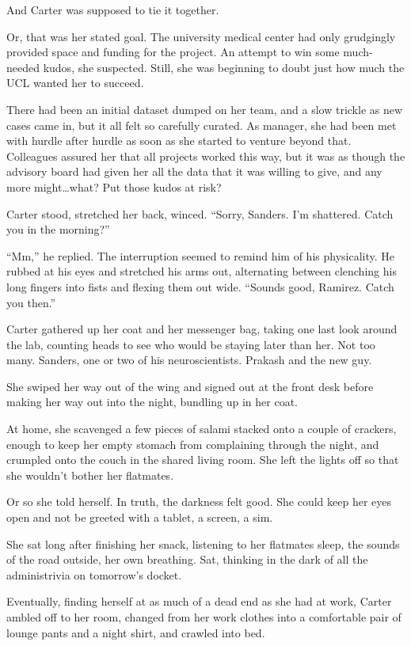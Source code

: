 And Carter was supposed to tie it together.

Or, that was her stated goal. The university medical center had only grudgingly provided space and funding for the project. An attempt to win some much-needed kudos, she suspected. Still, she was beginning to doubt just how much the UCL wanted her to succeed.

There had been an initial dataset dumped on her team, and a slow trickle as new cases came in, but it all felt so carefully curated. As manager, she had been met with hurdle after hurdle as soon as she started to venture beyond that. Colleagues assured her that all projects worked this way, but it was as though the advisory board had given her all the data that it was willing to give, and any more might\ldots{}what? Put those kudos at risk?

Carter stood, stretched her back, winced. ``Sorry, Sanders. I'm shattered. Catch you in the morning?''

``Mm,'' he replied. The interruption seemed to remind him of his physicality. He rubbed at his eyes and stretched his arms out, alternating between clenching his long fingers into fists and flexing them out wide. ``Sounds good, Ramirez. Catch you then.''

Carter gathered up her coat and her messenger bag, taking one last look around the lab, counting heads to see who would be staying later than her. Not too many. Sanders, one or two of his neuroscientists. Prakash and the new guy.

She swiped her way out of the wing and signed out at the front desk before making her way out into the night, bundling up in her coat.

At home, she scavenged a few pieces of salami stacked onto a couple of crackers, enough to keep her empty stomach from complaining through the night, and crumpled onto the couch in the shared living room. She left the lights off so that she wouldn't bother her flatmates.

Or so she told herself. In truth, the darkness felt good. She could keep her eyes open and not be greeted with a tablet, a screen, a sim.

She sat long after finishing her snack, listening to her flatmates sleep, the sounds of the road outside, her own breathing. Sat, thinking in the dark of all the administrivia on tomorrow's docket.

Eventually, finding herself at as much of a dead end as she had at work, Carter ambled off to her room, changed from her work clothes into a comfortable pair of lounge pants and a night shirt, and crawled into bed.
